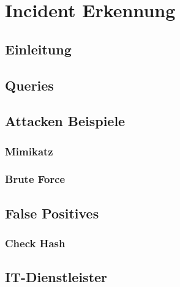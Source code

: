 \chapter{Incident Erkennung}
\section{Einleitung}

\section{Queries}

\section{Attacken Beispiele}
\subsection{Mimikatz}



\subsection{Brute Force}




\section{False Positives}
\subsection{Check Hash}


\section{IT-Dienstleister}